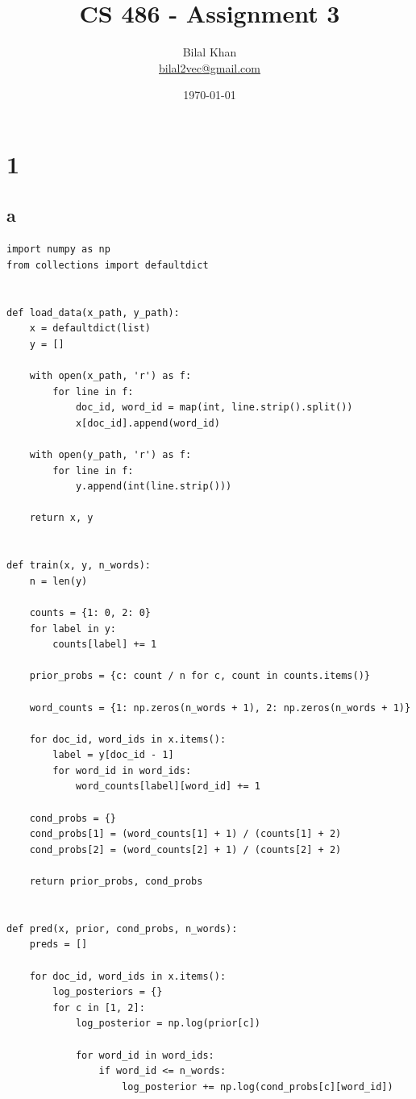 \documentclass[11pt]{article}
\title{CS 486 - Assignment 3}
\author{Bilal Khan\\
\href{mailto:bilal2vec@gmail.com}{bilal2vec@gmail.com}}
\date{\today}
\begin{document}
\maketitle
\tableofcontents

\section{1}

\subsection{a}

\begin{verbatim}
import numpy as np
from collections import defaultdict


def load_data(x_path, y_path):
    x = defaultdict(list)
    y = []

    with open(x_path, 'r') as f:
        for line in f:
            doc_id, word_id = map(int, line.strip().split())
            x[doc_id].append(word_id)

    with open(y_path, 'r') as f:
        for line in f:
            y.append(int(line.strip()))

    return x, y


def train(x, y, n_words):
    n = len(y)

    counts = {1: 0, 2: 0}
    for label in y:
        counts[label] += 1

    prior_probs = {c: count / n for c, count in counts.items()}

    word_counts = {1: np.zeros(n_words + 1), 2: np.zeros(n_words + 1)}

    for doc_id, word_ids in x.items():
        label = y[doc_id - 1]
        for word_id in word_ids:
            word_counts[label][word_id] += 1

    cond_probs = {}
    cond_probs[1] = (word_counts[1] + 1) / (counts[1] + 2)
    cond_probs[2] = (word_counts[2] + 1) / (counts[2] + 2)

    return prior_probs, cond_probs


def pred(x, prior, cond_probs, n_words):
    preds = []

    for doc_id, word_ids in x.items():
        log_posteriors = {}
        for c in [1, 2]:
            log_posterior = np.log(prior[c])

            for word_id in word_ids:
                if word_id <= n_words:
                    log_posterior += np.log(cond_probs[c][word_id])


\end{verbatim}
\end{document}
